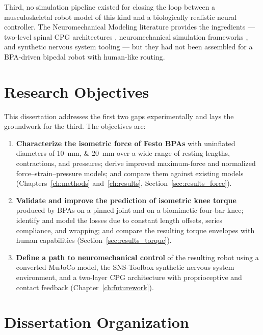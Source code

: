 Third, no simulation pipeline existed for closing the loop between a musculoskeletal robot model of this kind and a biologically realistic neural controller. The Neuromechanical Modeling literature provides the ingredients --- two-level spinal CPG architectures \citep{rybak_modelling_2006, mccrea_organization_2008}, neuromechanical simulation frameworks \citep{markin_afferent_2010}, and synthetic nervous system tooling \citep{nourse_sns_2023} --- but they had not been assembled for a BPA-driven bipedal robot with human-like routing.

\section{Research Objectives}\label{sec:objectives}

This dissertation addresses the first two gaps experimentally and lays the groundwork for the third. The objectives are:

\begin{enumerate}
    \item \textbf{Characterize the isometric force of Festo BPAs} with uninflated diameters of \qtylist{10;20}{\mm} over a wide range of resting lengths, contractions, and pressures; derive improved maximum-force and normalized force--strain--pressure models; and compare them against existing models (Chapters~\ref{ch:methods} and~\ref{ch:results}, Section~\ref{sec:results_force}).
    \item \textbf{Validate and improve the prediction of isometric knee torque} produced by BPAs on a pinned joint and on a biomimetic four-bar knee; identify and model the losses due to constant length offsets, series compliance, and wrapping; and compare the resulting torque envelopes with human capabilities (Section~\ref{sec:results_torque}).
    \item \textbf{Define a path to neuromechanical control} of the resulting robot using a converted MuJoCo model, the SNS-Toolbox synthetic nervous system environment, and a two-layer CPG architecture with proprioceptive and contact feedback (Chapter~\ref{ch:futurework}).
\end{enumerate}

\section{Dissertation Organization}\label{sec:organization}


